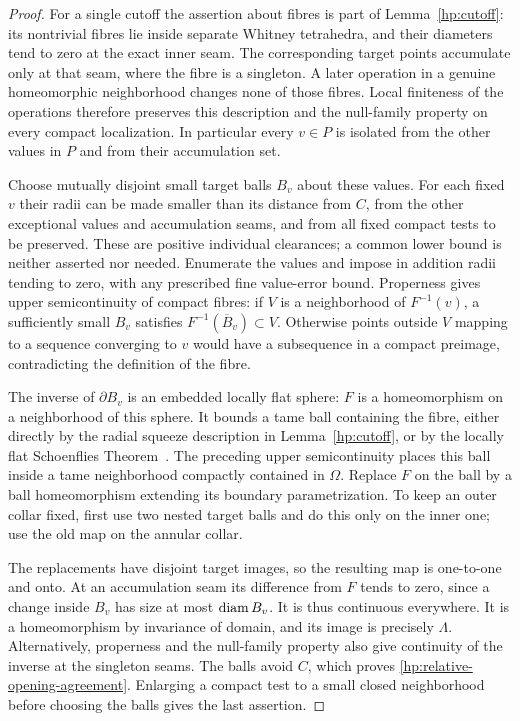 \begin{proof}
For a single cutoff the assertion about fibres is part of
Lemma~\ref{hp:cutoff}: its nontrivial fibres lie inside separate
Whitney tetrahedra, and their diameters tend to zero at the exact
inner seam.  The corresponding target points accumulate only at that
seam, where the fibre is a singleton.  A later operation in a genuine
homeomorphic neighborhood changes none of those fibres.  Local
finiteness of the operations therefore preserves this description and
the null-family property on every compact localization.  In
particular every $v\in P$ is isolated from the other values in $P$
and from their accumulation set.

Choose mutually disjoint small target balls $B_v$ about these values.
For each fixed $v$ their radii can be made smaller than its distance
from $C$, from the other exceptional values and accumulation seams,
and from all fixed compact tests to be preserved.  These are positive
individual clearances; a common lower bound is neither asserted nor
needed.  Enumerate the values and impose in addition radii tending to
zero, with any prescribed fine value-error bound.  Properness gives
upper semicontinuity of compact fibres: if $V$ is a neighborhood of
$F^{-1}(v)$, a sufficiently small $B_v$ satisfies
$F^{-1}(\overline B_v)\subset V$.  Otherwise points outside $V$
mapping to a sequence converging to $v$ would have a subsequence in a
compact preimage, contradicting the definition of the fibre.

The inverse of $\partial B_v$ is an embedded locally flat sphere:
$F$ is a homeomorphism on a neighborhood of this sphere.  It bounds a
tame ball containing the fibre, either directly by the radial squeeze
description in Lemma~\ref{hp:cutoff}, or by the locally flat
Schoenflies Theorem~\cite[Theorem~5]{Brown1960}.  The preceding
upper semicontinuity places this ball inside a tame neighborhood
compactly contained in $\Omega$.  Replace $F$ on the ball by a ball
homeomorphism extending its boundary parametrization.  To keep an
outer collar fixed, first use two nested target balls and do this
only on the inner one; use the old map on the annular collar.

The replacements have disjoint target images, so the resulting map
is one-to-one and onto.  At an accumulation seam its difference from
$F$ tends to zero, since a change inside $B_v$ has size at most
$\operatorname{diam} B_v$.  It is thus continuous everywhere.  It is a
homeomorphism by invariance of domain, and its image is precisely
$\Lambda$.  Alternatively, properness and the null-family property
also give continuity of the inverse at the singleton seams.  The
balls avoid $C$, which proves
\eqref{hp:relative-opening-agreement}.  Enlarging a compact test to
a small closed neighborhood before choosing the balls gives the last
assertion.
\end{proof}


